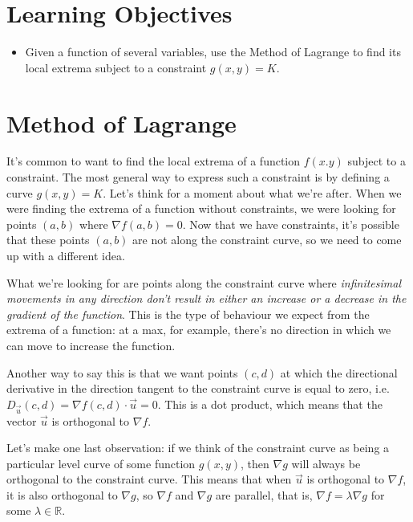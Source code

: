 \documentclass[
]{book}
\providecommand{\tightlist}{%
  \setlength{\itemsep}{0pt}\setlength{\parskip}{0pt}}
\theoremstyle{definition}
\theoremstyle{definition}
\theoremstyle{definition}
\theoremstyle{definition}
\theoremstyle{remark}
\begin{document}
\hypertarget{learning-objectives-8}{%
\section{Learning Objectives}\label{learning-objectives-8}}

\begin{itemize}
\tightlist
\item
  Given a function of several variables, use the Method of Lagrange to find its local extrema subject to a constraint \(g(x,y)=K\).
\end{itemize}

\hypertarget{method-of-lagrange}{%
\section{Method of Lagrange}\label{method-of-lagrange}}

It's common to want to find the local extrema of a function \(f(x.y)\) subject to a constraint. The most general way to express such a constraint is by defining a curve \(g(x,y)=K\). Let's think for a moment about what we're after. When we were finding the extrema of a function without constraints, we were looking for points \((a,b)\) where \(\nabla f (a,b)=0\). Now that we have constraints, it's possible that these points \((a,b)\) are not along the constraint curve, so we need to come up with a different idea.

What we're looking for are points along the constraint curve where \emph{infinitesimal movements in any direction don't result in either an increase or a decrease in the gradient of the function}. This is the type of behaviour we expect from the extrema of a function: at a max, for example, there's no direction in which we can move to increase the function.

Another way to say this is that we want points \((c,d)\) at which the directional derivative in the direction tangent to the constraint curve is equal to zero, i.e.\(D_{\vec{u}}(c,d)=\nabla f(c,d)\cdot\vec{u} =0\). This is a dot product, which means that the vector \(\vec{u}\) is orthogonal to \(\nabla f\).

Let's make one last observation: if we think of the constraint curve as being a particular level curve of some function \(g(x,y)\), then \(\nabla g\) will always be orthogonal to the constraint curve. This means that when \(\vec{u}\) is orthogonal to \(\nabla f\), it is also orthogonal to \(\nabla g\), so \(\nabla f\) and \(\nabla g\) are parallel, that is, \(\nabla f = \lambda \nabla g\) for some \(\lambda \in\mathbb{R}\).
\end{document}
